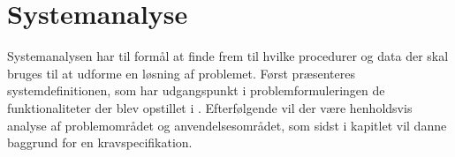 \chapter{Systemanalyse}\label{chapter:systemanalyse}
Systemanalysen har til formål at finde frem til hvilke procedurer og data der skal bruges til at udforme en løsning af problemet.
Først præsenteres systemdefinitionen, som har udgangspunkt i problemformuleringen de funktionaliteter der blev opstillet i .
Efterfølgende vil der være henholdsvis analyse af problemområdet og anvendelsesområdet, som sidst i kapitlet vil danne baggrund for en kravspecifikation.





